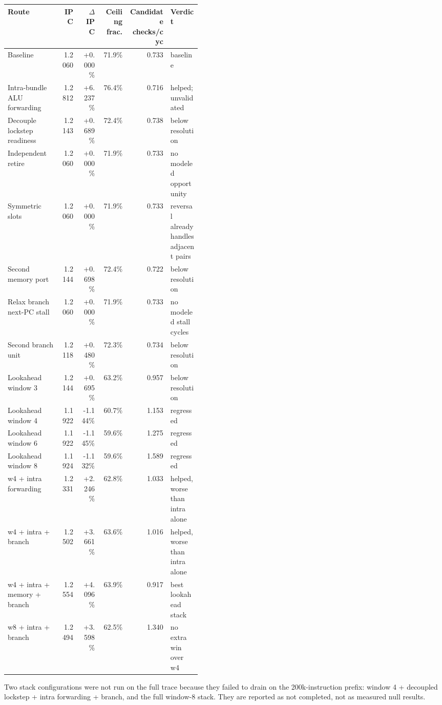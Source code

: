 \documentclass[10pt]{article}
\begin{document}
\begin{longtable}{@{}p{0.28\linewidth}rrrrp{0.16\linewidth}@{}}
\toprule
Route & IPC & $\Delta$ IPC & Ceiling frac. & Candidate checks/cyc & Verdict \\
\midrule
\endhead
Baseline & 1.2060 & +0.000\% & 71.9\% & 0.733 & baseline \\
Intra-bundle ALU forwarding & 1.2812 & +6.237\% & 76.4\% & 0.716 & helped; unvalidated \\
Decouple lockstep readiness & 1.2143 & +0.689\% & 72.4\% & 0.738 & below resolution \\
Independent retire & 1.2060 & +0.000\% & 71.9\% & 0.733 & no modeled opportunity \\
Symmetric slots & 1.2060 & +0.000\% & 71.9\% & 0.733 & reversal already handles adjacent pairs \\
Second memory port & 1.2144 & +0.698\% & 72.4\% & 0.722 & below resolution \\
Relax branch next-PC stall & 1.2060 & +0.000\% & 71.9\% & 0.733 & no modeled stall cycles \\
Second branch unit & 1.2118 & +0.480\% & 72.3\% & 0.734 & below resolution \\
Lookahead window 3 & 1.2144 & +0.695\% & 63.2\% & 0.957 & below resolution \\
Lookahead window 4 & 1.1922 & -1.144\% & 60.7\% & 1.153 & regressed \\
Lookahead window 6 & 1.1922 & -1.145\% & 59.6\% & 1.275 & regressed \\
Lookahead window 8 & 1.1924 & -1.132\% & 59.6\% & 1.589 & regressed \\
w4 + intra forwarding & 1.2331 & +2.246\% & 62.8\% & 1.033 & helped, worse than intra alone \\
w4 + intra + branch & 1.2502 & +3.661\% & 63.6\% & 1.016 & helped, worse than intra alone \\
w4 + intra + memory + branch & 1.2554 & +4.096\% & 63.9\% & 0.917 & best lookahead stack \\
w8 + intra + branch & 1.2494 & +3.598\% & 62.5\% & 1.340 & no extra win over w4 \\
\bottomrule
\end{longtable}

Two stack configurations were not run on the full trace because they failed to
drain on the 200k-instruction prefix: window 4 + decoupled lockstep + intra
forwarding + branch, and the full window-8 stack. They are reported as not
completed, not as measured null results.
\end{document}
